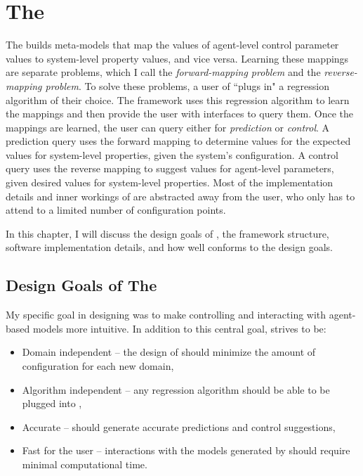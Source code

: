 \chapter{The \FRAMEWORK}
\thispagestyle{plain}

\label{Framework}

The \framework builds meta-models that map the values of agent-level control parameter values to system-level property values, and vice versa.
Learning these mappings are separate problems, which I call the \textit{forward-mapping problem} and the \textit{reverse-mapping problem}.
To solve these problems, a user of \fw ``plugs in" a regression algorithm of their choice.
The framework uses this regression algorithm to learn the mappings and then provide the user with interfaces to query them.
Once the mappings are learned, the user can query either for \textit{prediction} or \textit{control}.
A prediction query uses the forward mapping to determine values for the expected values for system-level properties, given the system's configuration.
A control query uses the reverse mapping to suggest values for agent-level parameters, given desired values for system-level properties.
Most of the implementation details and inner workings of \fw are abstracted away from the user, who only has to attend to a limited number of configuration points.

In this chapter, I will discuss the design goals of \fw, the framework structure, software implementation details, and how well \fw conforms to the design goals.


\section{Design Goals of The \framework}

My specific goal in designing \fw was to make controlling and interacting with agent-based models more intuitive.
In addition to this central goal, \fw strives to be:
\begin{itemize}
  \item Domain independent -- the design of \fw should minimize the amount of configuration for each new domain,
  \item Algorithm independent -- any regression algorithm should be able to be plugged into \fw,
  \item Accurate -- \fw should generate accurate predictions and control suggestions,
  \item Fast for the user -- interactions with the models generated by \fw should require minimal computational time.
\end{itemize}

